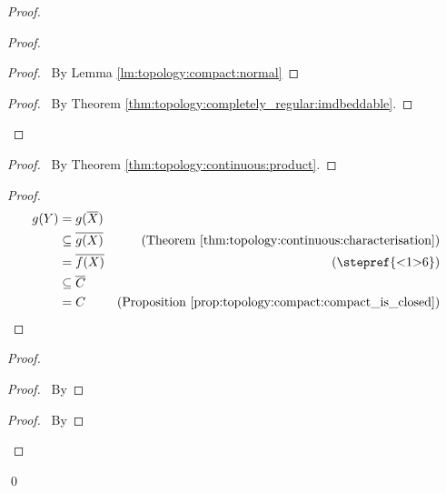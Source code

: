 \begin{proof}
  \pf
  \begin{proof}
    \begin{proof}
      \pf\ By Lemma \ref{lm:topology:compact:normal}
    \end{proof}
    \qedstep
    \begin{proof}
      \pf\ By Theorem \ref{thm:topology:completely_regular:imdbeddable}.
    \end{proof}
  \end{proof}
  \begin{proof}
    \pf\ By Theorem \ref{thm:topology:continuous:product}.
  \end{proof}
  \begin{proof}
    \pf
    \begin{align*}
      g(Y) & = g(\overline{X}) \\
      & \subseteq \overline{g(X)} & (\text{Theorem \ref{thm:topology:continuous:characterisation}})\\
      & = \overline{f(X)} & (\text{\stepref{<1>6}})\\
      & \subseteq \overline{C} \\
      & = C & (\text{Proposition \ref{prop:topology:compact:compact_is_closed}})
    \end{align*}
  \end{proof}
  \begin{proof}
    \begin{proof}
      \pf\ By 
    \end{proof}
    \begin{proof}
      \pf\ By 
    \end{proof}
  \end{proof}
  \qed
\end{proof}

